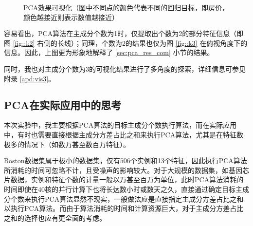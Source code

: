 \documentclass[12pt,a4paper]{article}
\theoremstyle{definition}
\begin{document}
\begin{figure}[H]
	\centering
	\caption{PCA效果可视化（图中不同点的颜色代表不同的回归目标，即房价，颜色越接近则表示数值越接近）}
	\label{fig:pca_vis}
\end{figure}

容易看出，PCA算法在主成分个数为1时，仅提取出个数为2的部分特征信息（即图 \ref{fig::k2} 右侧的长线）；同理，个数为2的结果也仅为图 \ref{fig::k3} 在俯视角度下的信息。因此，上图更为形象地解释了 \ref{sec:pca_res_com} 小节的结果。

同时，我也对主成分个数为3的可视化结果进行了多角度的探索，详细信息可参见附录 \ref{apd:vis3}。

\subsection{PCA在实际应用中的思考}
\label{sec:dis}

本次实验中，我主要根据PCA算法的目标主成分个数执行算法，而在实际应用中，有时也需要直接根据主成分方差占比之和来执行PCA算法，尤其是在特征数极多的情况下（如数万甚至数百万特征）。

Boston数据集属于极小的数据集，仅有506个实例和13个特征，因此执行PCA算法所消耗的时间可忽略不计，且受噪声的影响较大。对于大规模的数据集，如基因芯片数据，实例和特征个数的计量一般以万甚至百万为单位，此时PCA算法消耗的时间即使在40核的并行计算下也将长达数小时或数天之久，直接通过确定目标主成分个数来执行PCA算法显然不现实，一般做法应是直接指定主成分方差占比之和以执行PCA算法。而由于算法消耗的时间和计算资源巨大，对于主成分方差占比之和的选择也应有更全面的考虑。
\end{document}
